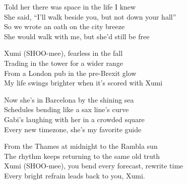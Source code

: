 \begin{lyrics}
Told her there was space in the life I knew\\
She said, “I’ll walk beside you, but not down your hall”\\
So we wrote an oath on the city breeze\\
She would walk with me, but she’d still be free

Xumi (SHOO-mee), fearless in the fall\\
Trading in the tower for a wider range\\
From a London pub in the pre-Brexit glow\\
My life swings brighter when it’s scored with Xumi

Now she’s in Barcelona by the shining sea\\
Schedules bending like a sax line’s curve\\
Gabi’s laughing with her in a crowded square\\
Every new timezone, she’s my favorite guide

From the Thames at midnight to the Rambla sun\\
The rhythm keeps returning to the same old truth\\
Xumi (SHOO-mee), you bend every forecast, rewrite time\\
Every bright refrain leads back to you, Xumi.
\end{lyrics}

